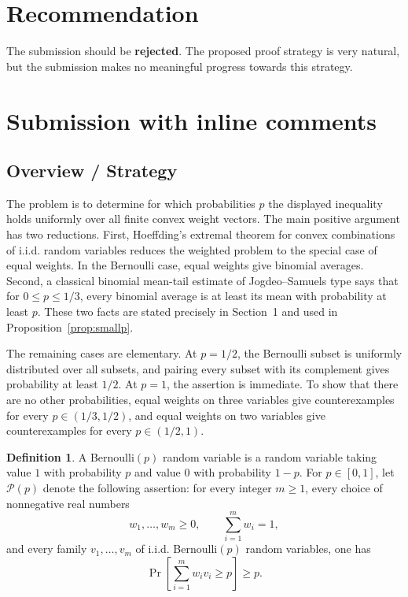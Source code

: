 \documentclass[12pt]{article}
\theoremstyle{definition}
\newtheorem{definition}{Definition}
\theoremstyle{plain}
\theoremstyle{remark}
\begin{document}
\section{Recommendation}

The submission should be \textbf{rejected}. The proposed proof strategy is very natural, but the submission makes no meaningful progress towards this strategy. 


\section{Submission with inline comments}

\date{}


\subsection*{Overview / Strategy}

The problem is to determine for which probabilities \(p\) the displayed inequality holds uniformly over all finite convex weight vectors. The main positive argument has two reductions. First, Hoeffding's extremal theorem for convex combinations of i.i.d. random variables reduces the weighted problem to the special case of equal weights. In the Bernoulli case, equal weights give binomial averages. Second, a classical binomial mean-tail estimate of Jogdeo--Samuels type says that for \(0\le p\le 1/3\), every binomial average is at least its mean with probability at least \(p\). These two facts are stated precisely in Section~1 and used in Proposition~\ref{prop:smallp}.

The remaining cases are elementary. At \(p=1/2\), the Bernoulli subset is uniformly distributed over all subsets, and pairing every subset with its complement gives probability at least \(1/2\). At \(p=1\), the assertion is immediate. To show that there are no other probabilities, equal weights on three variables give counterexamples for every \(p\in(1/3,1/2)\), and equal weights on two variables give counterexamples for every \(p\in(1/2,1)\).

\begin{definition}
A Bernoulli\((p)\) random variable is a random variable taking value \(1\) with probability \(p\) and value \(0\) with probability \(1-p\). For \(p\in[0,1]\), let \(\mathcal P(p)\) denote the following assertion:
for every integer \(m\ge1\), every choice of nonnegative real numbers
\[
w_1,\ldots,w_m\ge0,\qquad \sum_{i=1}^{m}w_i=1,
\]
and every family \(v_1,\ldots,v_m\) of i.i.d. Bernoulli\((p)\) random variables, one has
\[
\Pr\!\left[\sum_{i=1}^{m}w_i v_i\ge p\right]\ge p.
\]
\end{definition}
\end{document}
